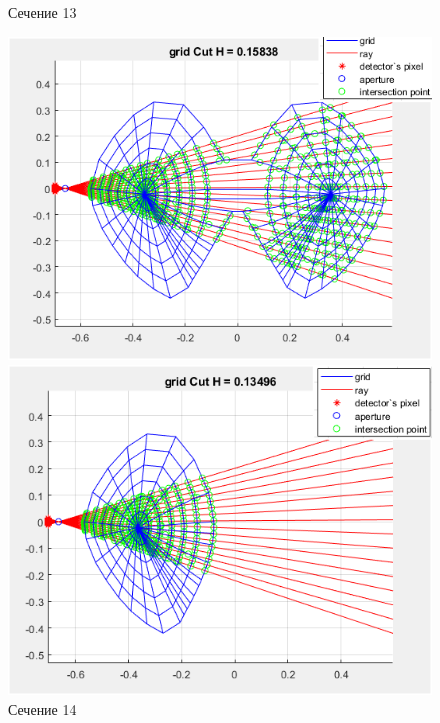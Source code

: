 \documentclass[a4]{article}
\begin{document}
\begin{figure}[H]
\begin{center}
\caption{Сечение 13}
\includegraphics{pic18.png} 

\caption{Сечение 14}
\includegraphics{pic19.png} 
\end{center}
\end{figure}
\end{document}
